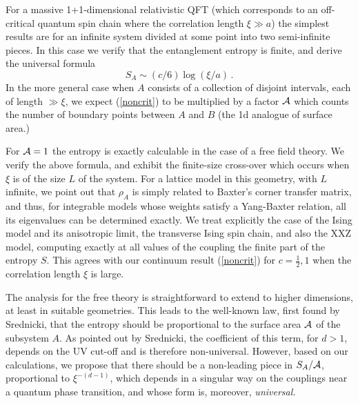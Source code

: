 \documentclass[preprint,aps]{revtex4}
\begin{document}
For a massive 1+1-dimensional relativistic QFT (which corresponds to an
off-critical quantum spin chain where the correlation length $\xi\gg a$)
the simplest results are for an infinite system divided at some point
into two semi-infinite pieces.
In this case we verify that
the entanglement entropy is finite, and derive the universal formula
\begin{equation}
\label{noncrit}
S_A\sim (c/6)\log(\xi/a)\,.
\end{equation}
In the more general case when $A$ consists of a collection of disjoint
intervals, each of length $\gg\xi$, we expect (\ref{noncrit}) to be
multiplied by a factor
$\cal A$ which counts the number of boundary points between $A$ and
$B$ (the 1d analogue of surface area.)

For ${\cal A}=1$ the entropy is exactly
calculable in the case of a free field theory. We verify the above
formula, and exhibit the finite-size
cross-over which occurs when $\xi$ is of the size $L$ of the system.
For a lattice model in this geometry, with $L$ infinite, we point out that
$\rho_A$ is simply related to Baxter's corner transfer matrix, and thus,
for integrable models whose weights satisfy a Yang-Baxter relation, all
its eigenvalues can be determined exactly. We treat explicitly the case
of the Ising model and its anisotropic limit, the transverse Ising spin
chain, and also the XXZ model,
computing exactly at all values of the coupling the finite
part of the entropy $S$. This agrees with our continuum result
(\ref{noncrit}) for $c=\frac12,1 $ when the correlation length $\xi$ is large.

The analysis for the free theory is straightforward to extend
to higher dimensions, at least in suitable geometries. This leads to the
well-known law, first found by Srednicki\cite{s-93}, that the
entropy should be proportional to the surface area $\cal A$ of the
subsystem $A$. As pointed out by Srednicki, the coefficient of this term,
for $d>1$, depends on the UV cut-off and is therefore non-universal.
However, based on our calculations, we propose that there should be a
non-leading piece in $S_A/{\cal A}$, proportional to $\xi^{-(d-1)}$,
which depends
in a singular way on the couplings near a quantum phase transition, and
whose form is, moreover, \em universal\em.
\end{document}
